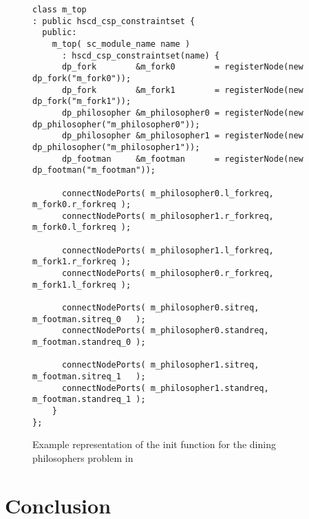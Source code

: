 \begin{figure}
\centering
\begin{verbatim}
class m_top
: public hscd_csp_constraintset {
  public:
    m_top( sc_module_name name )
      : hscd_csp_constraintset(name) {
      dp_fork        &m_fork0        = registerNode(new dp_fork("m_fork0"));
      dp_fork        &m_fork1        = registerNode(new dp_fork("m_fork1"));
      dp_philosopher &m_philosopher0 = registerNode(new dp_philosopher("m_philosopher0"));
      dp_philosopher &m_philosopher1 = registerNode(new dp_philosopher("m_philosopher1"));
      dp_footman     &m_footman      = registerNode(new dp_footman("m_footman"));
      
      connectNodePorts( m_philosopher0.l_forkreq, m_fork0.r_forkreq );
      connectNodePorts( m_philosopher1.r_forkreq, m_fork0.l_forkreq );
      
      connectNodePorts( m_philosopher1.l_forkreq, m_fork1.r_forkreq );
      connectNodePorts( m_philosopher0.r_forkreq, m_fork1.l_forkreq );
      
      connectNodePorts( m_philosopher0.sitreq,   m_footman.sitreq_0   );
      connectNodePorts( m_philosopher0.standreq, m_footman.standreq_0 );

      connectNodePorts( m_philosopher1.sitreq,   m_footman.sitreq_1   );
      connectNodePorts( m_philosopher1.standreq, m_footman.standreq_1 );
    }
};
\end{verbatim}
\caption{\label{dining-philosophers-csp-systemoc}
  Example representation of the init function for the
  dining philosophers problem in \SysteMoC{}}
\end{figure}

\section{Conclusion}\label{conclusion}



\clearpage
\appendix




